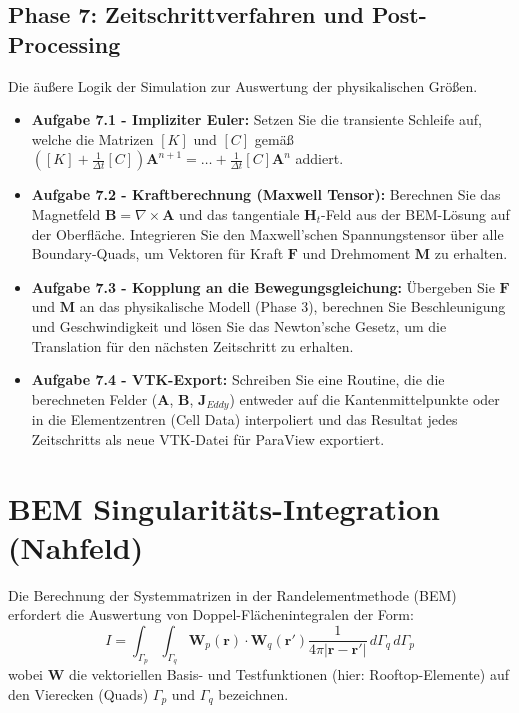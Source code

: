 \documentclass[11pt,a4paper]{article}
\newcommand{\vA}{\bm{A}}
\newcommand{\vB}{\bm{B}}
\newcommand{\vH}{\bm{H}}
\newcommand{\vJ}{\bm{J}}
\newcommand{\vW}{\bm{W}} %
\newcommand{\rot}{\nabla \times}
\begin{document}
\subsection{Phase 7: Zeitschrittverfahren und Post-Processing}
Die äußere Logik der Simulation zur Auswertung der physikalischen Größen.

\begin{itemize}
    \item \textbf{Aufgabe 7.1 - Impliziter Euler:} Setzen Sie die transiente Schleife auf, welche die Matrizen $[K]$ und $[C]$ gemäß $([K] + \frac{1}{\Delta t}[C]) \vA^{n+1} = \dots + \frac{1}{\Delta t}[C] \vA^n$ addiert.
    \item \textbf{Aufgabe 7.2 - Kraftberechnung (Maxwell Tensor):} Berechnen Sie das Magnetfeld $\vB = \rot \vA$ und das tangentiale $\vH_t$-Feld aus der BEM-Lösung auf der Oberfläche. Integrieren Sie den Maxwell'schen Spannungstensor über alle Boundary-Quads, um Vektoren für Kraft $\bm{F}$ und Drehmoment $\bm{M}$ zu erhalten.
    \item \textbf{Aufgabe 7.3 - Kopplung an die Bewegungsgleichung:} Übergeben Sie $\bm{F}$ und $\bm{M}$ an das physikalische Modell (Phase 3), berechnen Sie Beschleunigung und Geschwindigkeit und lösen Sie das Newton'sche Gesetz, um die Translation für den nächsten Zeitschritt zu erhalten.
    \item \textbf{Aufgabe 7.4 - VTK-Export:} Schreiben Sie eine Routine, die die berechneten Felder ($\vA$, $\vB$, $\vJ_{Eddy}$) entweder auf die Kantenmittelpunkte oder in die Elementzentren (Cell Data) interpoliert und das Resultat jedes Zeitschritts als neue VTK-Datei für ParaView exportiert.
\end{itemize}

\section{BEM Singularitäts-Integration (Nahfeld)}

Die Berechnung der Systemmatrizen in der Randelementmethode (BEM) erfordert die Auswertung von Doppel-Flächenintegralen der Form:
\begin{equation}
    I = \int_{\Gamma_p} \int_{\Gamma_q} \vW_p(\bm{r}) \cdot \vW_q(\bm{r}') \frac{1}{4\pi |\bm{r} - \bm{r}'|} \, d\Gamma_q \, d\Gamma_p
\end{equation}
wobei $\vW$ die vektoriellen Basis- und Testfunktionen (hier: Rooftop-Elemente) auf den Vierecken (Quads) $\Gamma_p$ und $\Gamma_q$ bezeichnen.
\end{document}
